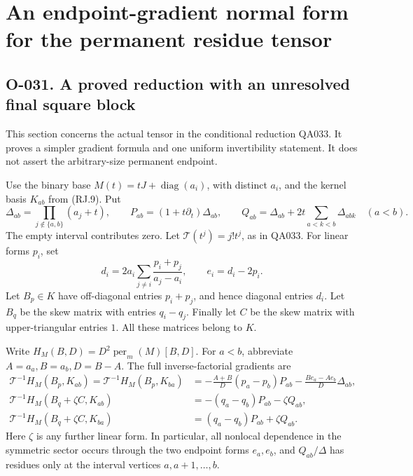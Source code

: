 \section{An endpoint-gradient normal form for the permanent residue tensor}

\subsection*{O-031. A proved reduction with an unresolved final square block}
This section concerns the actual tensor in the conditional
reduction QA033. It proves a simpler gradient formula and
one uniform invertibility statement. It does not assert
the arbitrary-size permanent endpoint.

Use the binary base \(M(t)=tJ+\operatorname{diag}(a_i)\),
with distinct \(a_i\), and the kernel basis \(K_{ab}\)
from (RJ.9). Put
\[
 \Delta_{ab}=\prod_{j\notin\{a,b\}}(a_j+t),\qquad
 P_{ab}=(1+t\partial_t)\Delta_{ab},\qquad
 Q_{ab}=\Delta_{ab}
             +2t\sum_{a<k<b}\Delta_{abk}\quad(a<b).
                                                               \tag{O-031.1}
\]
The empty interval contributes zero. Let
\(\mathcal T(t^j)=j!t^j\), as in QA033.
For linear forms \(p_i\), set
\[
 d_i=2a_i\sum_{j\ne i}\frac{p_i+p_j}{a_j-a_i},
                         \qquad e_i=d_i-2p_i.
                                                               \tag{O-031.2}
\]
Let \(B_p\in K\) have off-diagonal entries \(p_i+p_j\),
and hence diagonal entries \(d_i\). Let \(B_q\) be the
skew matrix with entries \(q_i-q_j\). Finally let \(C\)
be the skew matrix with upper-triangular entries \(1\).
All these matrices belong to \(K\).

Write \(H_M(B,D)=D^2\operatorname{per}_m(M)[B,D]\).
For \(a<b\), abbreviate \(A=a_a,B=a_b,D=B-A\).
The full inverse-factorial gradients are
\[
 \begin{split}
 \mathcal T^{-1}H_M(B_p,K_{ab})
   =\mathcal T^{-1}H_M(B_p,K_{ba})
   &=-\frac{A+B}{D}(p_a-p_b)P_{ab}
       -\frac{B e_a-A e_b}{D}\Delta_{ab},\\
 \mathcal T^{-1}H_M(B_q+\zeta C,K_{ab})
   &=-(q_a-q_b)P_{ab}-\zeta Q_{ab},\\
 \mathcal T^{-1}H_M(B_q+\zeta C,K_{ba})
   &=(q_a-q_b)P_{ab}+\zeta Q_{ab}.
 \end{split}                                                   \tag{O-031.3}
\]
Here \(\zeta\) is any further linear form. In particular,
all nonlocal dependence in the symmetric sector occurs
through the two endpoint forms \(e_a,e_b\), and
\(Q_{ab}/\Delta\) has residues only at the interval
vertices \(a,a+1,\ldots,b\).

